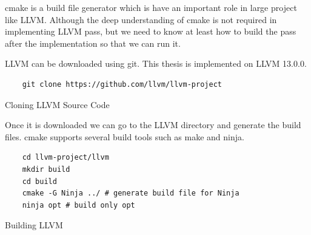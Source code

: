 cmake is a build file generator which is have an important role in large project like LLVM. Although the deep understanding of cmake is not required in implementing LLVM pass, but we need to know at least how to build the pass after the implementation so that we can run it.

LLVM can be downloaded using git. This thesis is implemented on LLVM 13.0.0.

\begin{listing}
\begin{verbatim}
    git clone https://github.com/llvm/llvm-project
\end{verbatim}
\caption{Cloning LLVM Source Code}    
\label{listing:2-9}
\end{listing}

Once it is downloaded we can go to the LLVM directory and generate the build files. cmake supports several build tools such as make and ninja. 

\begin{listing}
\begin{verbatim}
    cd llvm-project/llvm
    mkdir build
    cd build
    cmake -G Ninja ../ # generate build file for Ninja
    ninja opt # build only opt
\end{verbatim}
\caption{Building LLVM}    
\label{listing:2-10}
\end{listing}